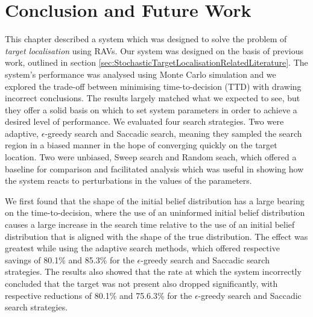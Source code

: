 \section{Conclusion and Future Work}


This chapter described a system which was designed to solve the problem of \textit{target localisation} using RAVs. Our system was designed on the basis of previous work, outlined in section \ref{sec:StochasticTargetLocalisationRelatedLiterature}. The system's performance was analysed using Monte Carlo simulation and we explored the trade-off between minimising time-to-decision (TTD) with drawing incorrect conclusions. The results largely matched what we expected to see, but they offer a solid basis on which to set system parameters in order to achieve a desired level of performance. We evaluated four search strategies. Two were adaptive, $\epsilon$-greedy search and Saccadic search, meaning they sampled the search region in a biased manner in the hope of converging quickly on the target location. Two were unbiased, Sweep search and Random seach, which offered a baseline for comparison and facilitated analysis which was useful in showing how the system reacts to perturbations in the values of the parameters.

We first found that the shape of the initial belief distribution has a large bearing on the time-to-decision, where the use of an uninformed initial belief distribution causes a large increase in the search time relative to the use of an initial belief distribution that is aligned with the shape of the true distribution. The effect was greatest while using the adaptive search methods, which offered respective savings of 80.1\% and 85.3\% for the $\epsilon$-greedy search and Saccadic search strategies. The results also showed that the rate at which the system incorrectly concluded that the target was not present also dropped significantly, with respective reductions of 80.1\% and 75.6.3\% for the $\epsilon$-greedy search and Saccadic search strategies. \par

